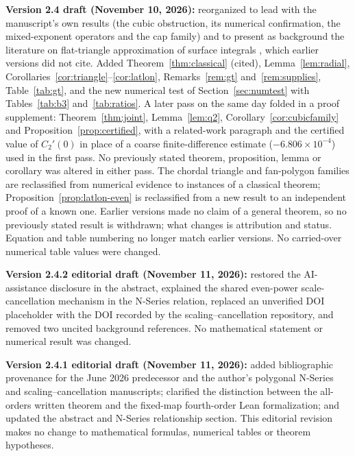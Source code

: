 \documentclass[11pt]{article}
\theoremstyle{remark}
\begin{document}
\textbf{Version 2.4 draft (November 10, 2026):} reorganized to lead with the manuscript's own
results (the cubic obstruction, its numerical confirmation, the mixed-exponent operators and
the cap family) and to present as background the literature on
flat-triangle approximation of surface integrals
\cite{georg91,georgtausch,verlindencools,lyness94}, which earlier versions did not cite.
Added Theorem~\ref{thm:classical} (cited), Lemma~\ref{lem:radial},
Corollaries~\ref{cor:triangle}--\ref{cor:latlon}, Remarks~\ref{rem:gt} and~\ref{rem:supplies},
Table~\ref{tab:gt}, and the new numerical test of Section~\ref{sec:numtest} with
Tables~\ref{tab:b3} and~\ref{tab:ratios}. A later pass on the same day folded in a proof supplement:
Theorem~\ref{thm:joint}, Lemma~\ref{lem:q2}, Corollary~\ref{cor:cubicfamily} and
Proposition~\ref{prop:certified}, with a related-work paragraph and the certified value of
$C_2'(0)$ in place of a coarse finite-difference estimate ($-6.806\times10^{-4}$) used in the
first pass. No previously stated theorem, proposition, lemma or corollary was altered in
either pass. The chordal triangle and fan-polygon families are reclassified from
numerical evidence to instances of a classical theorem; Proposition~\ref{prop:latlon-even} is
reclassified from a new result to an independent proof of a known one. Earlier versions made
no claim of a general theorem, so no previously stated result is withdrawn; what changes is
attribution and status. Equation and table numbering no longer match earlier versions. No
carried-over numerical table values were changed.

\textbf{Version 2.4.2 editorial draft (November 11, 2026):}
restored the AI-assistance disclosure in the abstract, explained the
shared even-power scale-cancellation mechanism in the N-Series relation,
replaced an unverified DOI placeholder with the DOI recorded by the
scaling--cancellation repository, and removed two uncited background
references. No mathematical statement or numerical result was changed.

\textbf{Version 2.4.1 editorial draft (November 11, 2026):}
added bibliographic provenance for the June 2026 predecessor and the
author's polygonal N-Series and scaling--cancellation manuscripts;
clarified the distinction between the all-orders written theorem and the
fixed-map fourth-order Lean formalization; and updated the abstract and
N-Series relationship section. This editorial revision makes no change
to mathematical formulas, numerical tables or theorem hypotheses.
\end{document}

